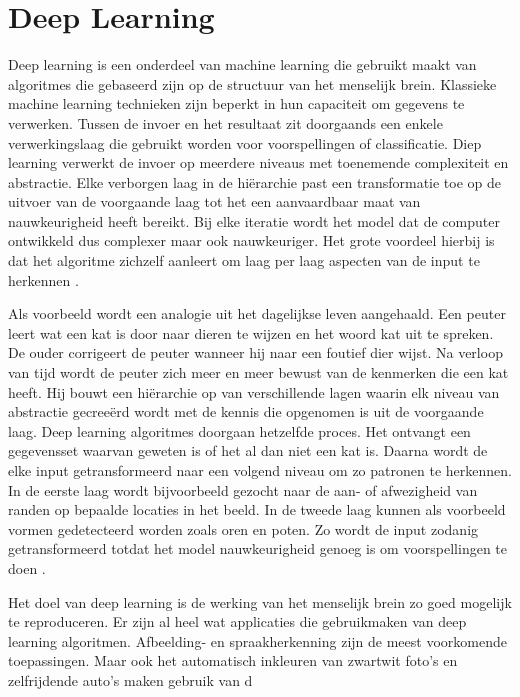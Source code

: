 \section{Deep Learning}
\label{sec:Deep Learning}
Deep learning is een onderdeel van machine learning die gebruikt maakt van algoritmes die gebaseerd zijn op de structuur van het menselijk brein. Klassieke machine learning technieken zijn beperkt in hun capaciteit om gegevens te verwerken. Tussen de invoer en het resultaat zit doorgaands een enkele verwerkingslaag die gebruikt worden voor voorspellingen of classificatie.  Diep learning verwerkt de invoer op meerdere niveaus met toenemende complexiteit en abstractie. Elke verborgen laag in de hiërarchie past een transformatie toe op de uitvoer van de voorgaande laag tot het een aanvaardbaar maat van nauwkeurigheid heeft bereikt. Bij elke iteratie wordt het model dat de computer ontwikkeld dus complexer maar ook nauwkeuriger. Het grote voordeel hierbij is dat het algoritme zichzelf aanleert om laag per laag aspecten van de input te herkennen \autocite{toronto}.

Als voorbeeld wordt een analogie uit het dagelijkse leven aangehaald. Een peuter leert wat een kat is door naar dieren te wijzen en het woord kat uit te spreken. De ouder corrigeert de peuter wanneer hij naar een foutief dier wijst. Na verloop van tijd wordt de peuter zich meer en meer bewust van de kenmerken die een kat heeft. Hij bouwt een hiërarchie op van verschillende lagen waarin elk niveau van abstractie gecreeërd wordt met de kennis die  opgenomen is uit de voorgaande laag. Deep learning algoritmes doorgaan hetzelfde proces. Het ontvangt een gegevensset waarvan geweten is of het al dan niet een kat is. Daarna wordt de elke input getransformeerd naar een volgend niveau om zo patronen te herkennen.  In de eerste laag wordt bijvoorbeeld gezocht naar de aan- of afwezigheid van randen op bepaalde locaties in het beeld. In de tweede laag kunnen als voorbeeld vormen gedetecteerd worden zoals oren en poten. Zo wordt de input zodanig getransformeerd totdat het model nauwkeurigheid genoeg is om voorspellingen te doen \autocite{techtarget}.

Het doel van deep learning is de werking van het menselijk brein zo goed mogelijk te reproduceren. Er zijn al heel wat applicaties die gebruikmaken van deep learning algoritmen. Afbeelding- en spraakherkenning zijn de meest voorkomende toepassingen. Maar ook het automatisch inkleuren van zwartwit foto’s en zelfrijdende auto’s maken gebruik van d


